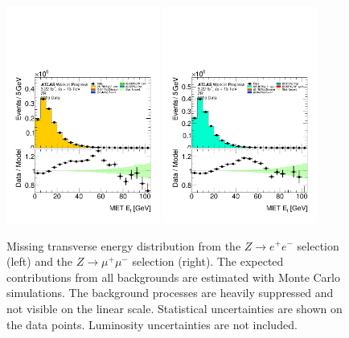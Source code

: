 \begin{figure}[htbp]
\centering
\includegraphics[width=0.45\textwidth]{figures/ZR/dataMc-met_reco_et-ZR-el.pdf}
\includegraphics[width=0.45\textwidth]{figures/ZR/dataMc-met_reco_et-ZR-mu.pdf}
\caption{
 Missing transverse energy distribution from the $Z \rightarrow e^+e^-$ selection (left) and the $Z \rightarrow \mu^+\mu^-$  selection (right).
The expected contributions from all backgrounds are estimated with Monte Carlo simulations.
The background processes are heavily suppressed and not visible on the linear scale. 
Statistical uncertainties are shown on the data points.
Luminosity uncertainties are not included.
}
\label{fig:ZR_met_reco_et}
\end{figure}

